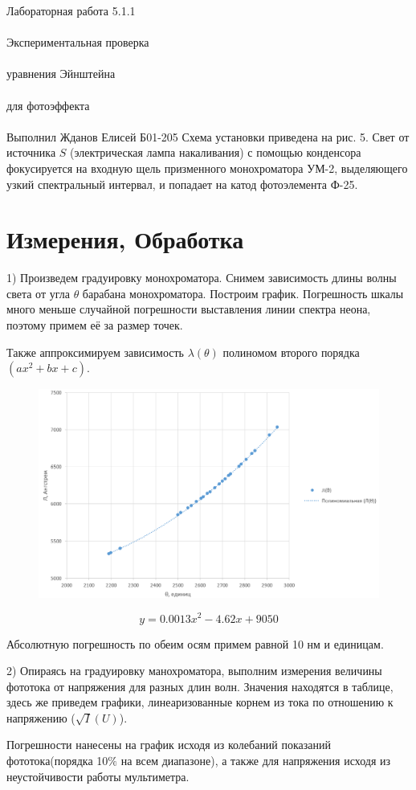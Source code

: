 \documentclass{astroedu-lab}
\begin{document}
\begin{problem}{\huge Лабораторная работа 5.1.1\\\\Экспериментальная проверка\\\\ уравнения Эйнштейна\\\\
для фотоэффекта\\\\Выполнил Жданов Елисей Б01-205}
Схема установки приведена на рис. 5. Свет от источника $S$ (электрическая лампа накаливания) с помощью конденсора фокусируется на входную щель призменного монохроматора УМ-2, выделяющего узкий спектральный интервал, и попадает на катод фотоэлемента Ф-25.


\section{Измерения, Обработка}

1) Произведем градуировку монохроматора. Снимем зависимость длины волны света от угла $\theta$ барабана монохроматора. Построим график. Погрешность шкалы много меньше случайной погрешности выставления линии спектра неона, поэтому примем её за размер точек.

Также аппроксимируем зависимость $\lambda(\theta)$ полиномом второго порядка $(a x^2 + b x + c)$.
\\
\begin{figure}[!h]
	\centering
	\includegraphics[width=1\textwidth]{2024-09-29_00-24-58}
	\label{fig:boiler}
\end{figure}

\begin{equation}
	y=0.0013 x^2 - 4.62 x + 9050
\end{equation}

Абсолютную погрешность по обеим осям примем равной 10 нм и единицам.

2) Опираясь на градуировку манохроматора, выполним измерения величины фототока от напряжения для разных длин волн. Значения находятся в таблице, здесь же приведем графики, линеаризованные корнем из тока по отношению к напряжению ($\sqrt{I}(U)$). 

Погрешности нанесены на график исходя из колебаний показаний фототока(порядка 10$\%$ на всем диапазоне), а также для напряжения исходя из неустойчивости работы мультиметра.



\end{problem}
\end{document}
